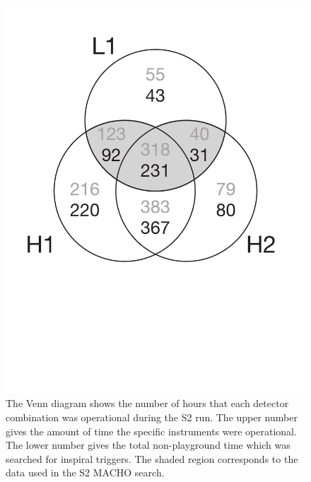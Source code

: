 
\newpage

\begin{figure}[p]
\begin{center}
\includegraphics[width=0.75\linewidth]{figures/result/s2_times}
\end{center}
\caption[Amounts of Single and Coincident Interferometer Data in S2]{%
\label{f:S2times}%
The Venn diagram shows the number of hours that each detector combination was
operational during the S2 run.  The upper number gives the amount of time the
specific instruments were operational.  The lower number gives the total
non-playground time which was searched for inspiral triggers.  The shaded
region corresponds to the data used in the S2 MACHO search.}
\end{figure}

